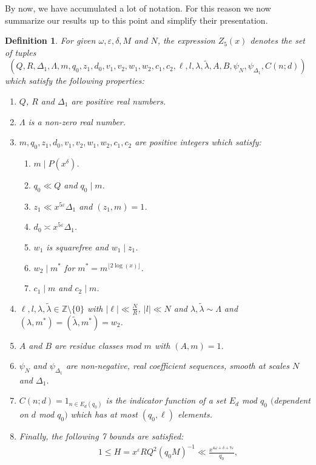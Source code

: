\documentclass{amsart}
\newtheorem{defn}{Definition}
\numberwithin{equation}{section}
\begin{document}
By now, we have accumulated a lot of notation. For this reason we now summarize our results up to this point and simplify their presentation. 

\begin{defn} \label{def:Z5}
For  given $\omega,\varepsilon, \delta, M$ and $N$,  the expression $Z_5(x)$ denotes the set of tuples $$(Q,R,\Delta_1,\Lambda, m,q_0,z_1,d_0,v_1,v_2,w_1,w_2,c_1,c_2,\ell,l,\lambda,\widetilde{\lambda},A,B,\psi_N,\psi_{\Delta_1}, C(n;d))$$ which satisfy the following  properties: 
\begin{enumerate}[{\rm (i)}]
\item $Q$, $R$ and $\Delta_1$ are positive real numbers.
\item $\Lambda$ is a non-zero real number.
\item $m,q_0,z_1,d_0,v_1,v_2,w_1,w_2, c_1,c_2$ are positive integers which satisfy:
\begin{enumerate}[{\rm (a)}]
\item $m \mid P(x^\delta)$.
\item $q_0 \ll Q$  and $q_0 \mid m$.
\item $z_1 \ll x^{5\varepsilon}\Delta_1$ and  $(z_1,m)=1$.
\item $d_0 \asymp x^{5\varepsilon}\Delta_1$. 
\item $w_1$ is  squarefree and $w_1 \mid z_1$. 
\item  $w_2 \mid m^*$ for $m^* = m^{\lfloor 2\log(x)\rfloor} $.
\item $c_1 \mid m$ and $c_2 \mid m$.
\end{enumerate}
\item  $\ell, l, \lambda, \widetilde{\lambda} \in \mathbb{Z}\setminus \{0\}$  with $|\ell|\ll \frac{N}{R}$, $|l| \ll N$ and $\lambda, \widetilde{\lambda} \sim \Lambda$ and $(\lambda,m^*) = (\widetilde{\lambda},m^*)=w_2$.
\item $A$ and $B$ are residue classes mod $m$ with $(A,m) =1 $. 
\item $\psi_N$ and $\psi_{\Delta_1}$  are non-negative, real coefficient sequences, smooth at scales $N$ and $\Delta_1$.
\item $C(n;d)=1_{n \in E_d (q_0)}$ is the indicator function of a set $E_d$ mod $q_0$ $($dependent on $d$ mod $q_0)$ which has at most $(q_0,\ell)$ elements. 
\item  Finally, the following 7 bounds are satisfied:
\begin{align*} 
&1 \leq H = x^\varepsilon RQ^2(q_0 M)^{-1}\ll \tfrac{x^{4\omega+\delta+7\varepsilon}}{q_0},\\

\end{align*}
\end{enumerate}
\end{defn}
\end{document}
